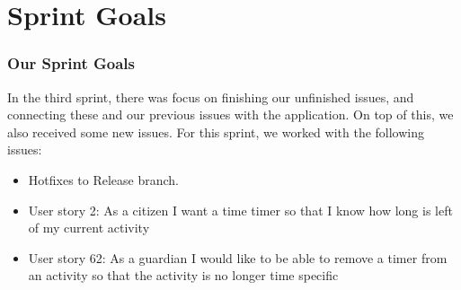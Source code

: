 \section{Sprint Goals}


\subsubsection{Our Sprint Goals}
In the third sprint, there was focus on finishing our unfinished issues, and connecting these and our previous issues with the application. 
On top of this, we also received some new issues. 
For this sprint, we worked with the following issues:
\begin{itemize}
    \item Hotfixes to Release branch.
    \item User story 2: As a citizen I want a time timer so that I know how long is left of my current activity
    \item User story 62: As a guardian I would like to be able to remove a timer from an activity so that the activity is no longer time specific
    
\end{itemize}